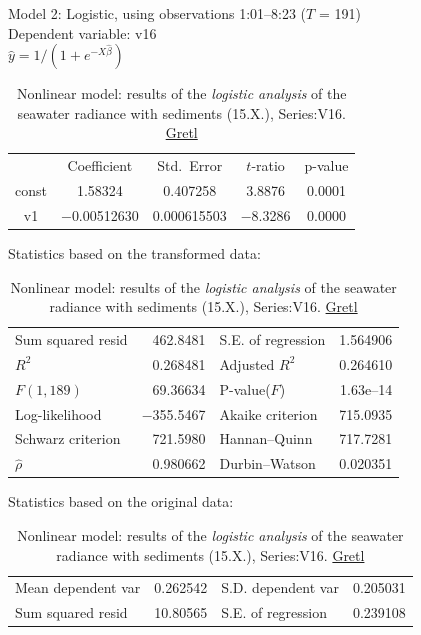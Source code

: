 \documentclass[11pt]{article}
\begin{document}
\begin{appendices}
\begin{table}
	\caption{Nonlinear model: results of the \textit{logistic analysis} of the seawater radiance with sediments (15.X.), Series:V16. \href{http://gretl.sourceforge.net/}{Gretl}}
	\begin{center}
	Model 2: Logistic, using observations 1:01--8:23 ($T$ = 191)\\
	Dependent variable: v16\\
	$\hat{y} = 1 / (1 + e^{-X\hat{\beta}})$
	
	\vspace{1em}
	\begin{tabular}{|c|c|c|c|c|}
		  & {Coefficient} & {Std.\ Error} & {$t$-ratio} & {p-value} \\[1ex]
		const &  1.58324 &     0.407258 &       3.8876 &         0.0001 \\
		v1 &   $-$0.00512630 &     0.000615503 &       $-$8.3286 &         0.0000 \\
	\end{tabular}

	\vspace{1em}Statistics based on the transformed data:

	\vspace{1ex}
	\begin{tabular}{lrlr}
		Sum squared resid &  462.8481 & S.E. of regression &  1.564906 \\
		$R^2$ &  0.268481 & Adjusted $R^2$ &  0.264610 \\
		$F(1, 189)$ &  69.36634 & P-value($F$) &  1.63\textrm{e--14} \\
		Log-likelihood & $-$355.5467 & Akaike criterion &  715.0935 \\
		Schwarz criterion &  721.5980 & Hannan--Quinn &  717.7281 \\
		$\hat{\rho}$ &  0.980662 & Durbin--Watson &  0.020351 \\
	\end{tabular}

	\vspace{1em}Statistics based on the original data:

	\vspace{1ex}
	\begin{tabular}{lrlr}
		Mean dependent var &  0.262542 & S.D. dependent var &  0.205031 \\
		Sum squared resid &  10.80565 & S.E. of regression &  0.239108 \\
	\end{tabular}
	\end{center}
	\label{tab:11}
\end{table}


\end{appendices}
\end{document}
